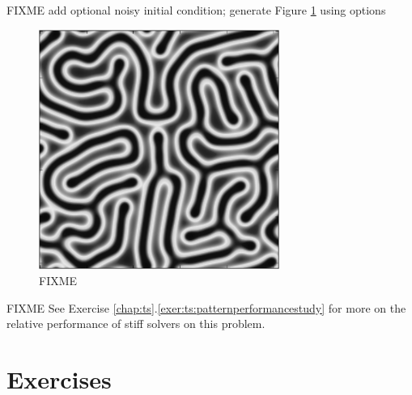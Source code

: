 FIXME add optional noisy initial condition; generate Figure \ref{fig:ts:pattern:snakes} using options

\begin{figure}
\includegraphics[width=0.7\textwidth]{figs/snakes}
\caption{FIXME}
\label{fig:ts:pattern:snakes}
\end{figure}

FIXME See Exercise \ref{chap:ts}.\ref{exer:ts:patternperformancestudy} for more on the relative performance of stiff solvers on this problem.


\section{Exercises}

